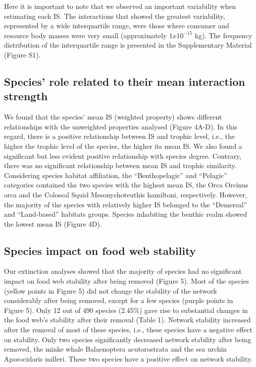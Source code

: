 \documentclass[gc, manuscript]{copernicus}
\begin{document}
Here it is important to note that we observed an important variability
when estimating each IS. The interactions that showed the greatest
variability, represented by a wide interquartile range, were those where
consumer and resource body masses were very small (approximately
\(1 x 10 ^{-15}\) kg). The frequency distribution of the interquartile
range is presented in the Supplementary Material (Figure S1).

\subsection{Species' role related to their mean interaction strength}

We found that the species' mean IS (weighted property) shows different
relationships with the unweighted properties analysed (Figure 4A-D). In
this regard, there is a positive relationship between IS and trophic
level, i.e., the higher the trophic level of the species, the higher its
mean IS. We also found a significant but less evident positive
relationship with species degree. Contrary, there was no significant
relationship between mean IS and trophic similarity. Considering species
habitat affiliation, the ``Benthopelagic'' and ``Pelagic'' categories
contained the two species with the highest mean IS, the Orca Orcinus
orca and the Colossal Squid Mesonychoteuthis hamiltoni, respectively.
However, the majority of the species with relatively higher IS belonged
to the ``Demersal'' and ``Land-based'' habitats groups. Species
inhabiting the benthic realm showed the lowest mean IS (Figure 4D).

\subsection{Species impact on food web stability}

Our extinction analyses showed that the majority of species had no
significant impact on food web stability after being removed (Figure 5).
Most of the species (yellow points in Figure 5) did not change the
stability of the network considerably after being removed, except for a
few species (purple points in Figure 5). Only 12 out of 490 species
(2.45\%) gave rise to substantial changes in the food web's stability
after their removal (Table 1). Network stability increased after the
removal of most of these species, i.e., these species have a negative
effect on stability. Only two species significantly decreased network
stability after being removed, the minke whale Balaenoptera
acutorostrata and the sea urchin Aporocidaris milleri. These two species
have a positive effect on network stability.
\end{document}
